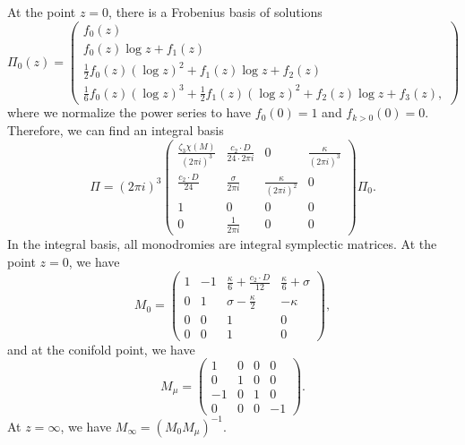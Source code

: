 \documentclass[10pt,oldfontcommands,oneside]{memoir}
\theoremstyle{definition}
\theoremstyle{remark}
\theoremstyle{plain}
\theoremstyle{definition}
\theoremstyle{remark}
\newcommand{\1}{\mathbf{1}}
\newcommand{\2}{\mathbf{2}}
\newcommand{\3}{\mathbf{3}}
\begin{document}
At the point $z=0$, there is a Frobenius basis of solutions
\[ \Pi_0(z) = \begin{pmatrix}
    f_0(z) \\
    f_0(z) \log z + f_1(z) \\
    \frac{1}{2}f_0(z) (\log z)^2 + f_1(z) \log z + f_2(z) \\
    \frac{1}{6} f_0(z) (\log z)^3 + \frac{1}{2} f_1(z) (\log z)^2 + f_2(z)\log z + f_3 (z),
\end{pmatrix}
\]
where we normalize the power series to have $f_0(0) = 1$ and $f_{k>0}(0) = 0$. Therefore, we can find an integral basis
\[ \Pi = (2\pi i)^3 \begin{pmatrix}
    \frac{\zeta_3 \chi(M)}{(2\pi i)^3} & \frac{c_2 \cdot D}{24 \cdot 2\pi i} & 0 & \frac{\kappa}{(2\pi i)^3} \\
    \frac{c_2 \cdot D}{24} & \frac{\sigma}{2\pi i} & \frac{\kappa}{(2\pi i)^2} & 0 \\
    1 & 0 & 0 & 0 \\
    0 & \frac{1}{2\pi i} & 0 & 0
\end{pmatrix} \Pi_0.
\]
In the integral basis, all monodromies are integral symplectic matrices. At the point $z=0$, we have
\[ M_0 = \begin{pmatrix}
    1 & -1 & \frac{\kappa}{6} + \frac{c_2 \cdot D}{12} & \frac{\kappa}{6} + \sigma \\
    0 & 1 & \sigma - \frac{\kappa}{2} & -\kappa \\
    0 & 0 & 1 & 0 \\
    0 & 0 & 1 & 0
\end{pmatrix},
\]
and at the conifold point, we have
\[ M_{\mu} = \begin{pmatrix}
    1 & 0 & 0 & 0 \\
    0 & 1 & 0 & 0 \\
    -1 & 0 & 1 & 0 \\
    0 & 0 & 0 & -1
\end{pmatrix}.
\]
At $z=\infty$, we have $M_{\infty} = (M_0 M_{\mu})^{-1}$.
\end{document}
